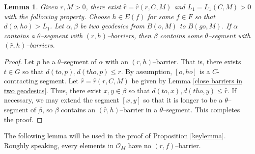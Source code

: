 \documentclass{amsart}
\newtheorem{lem}[thm]{Lemma}
\theoremstyle{definition}
\theoremstyle{remark}
\newcommand{\ax}{\mathrm{Ax}}
\begin{document}
\begin{lem}\label{ExistsThetaBarrier}
Given $r, M>0$, there exist $\hat r=\hat r(r,C,M)$ and $L_1=L_1(C,M)>0$ with the following property. Choose $h\in E( f)$ for some $f\in F$ so that $d(o,ho)>L_1$. Let  $\alpha, \beta$ be two geodesics  from $B(o,M)$ to $B(go,M)$. If $\alpha$ contains a $\theta$--segment with $(r,  h)$--barriers, then $\beta$ contains some $\theta$--segment with  $(\hat r, h)$--barriers.      
\end{lem}
\begin{proof}
Let $p$ be a $\theta$--segment of $\alpha$ with an $(r,  h)$--barrier. That is, there exists  $t\in G$ so that  $d(to,p), d(t ho,p)\le r$. By assumption, $[o,ho]$ is a $C$-contracting segment. Let $\hat r=\hat r(r,C,M)$ be given by Lemma \ref{close barriers in two geodesics}. Thus, there exist $x,y\in \beta$ so that $d(to, x), d(tho,y)\le \hat r$.  If necessary, we may extend the segment $[x,y]$ so that it is longer to be a $\theta$--segment of $\beta$, so $\beta$ contains an $(\hat r, h)$--barrier in a $\theta$--segment. This completes the proof. 
\end{proof}

The following lemma will be used in the proof of Proposition \ref{keylemma}. Roughly speaking, every elements in $\mathcal{O}_{M}$ have  no $(r,f)$--barrier. %
\end{document}
